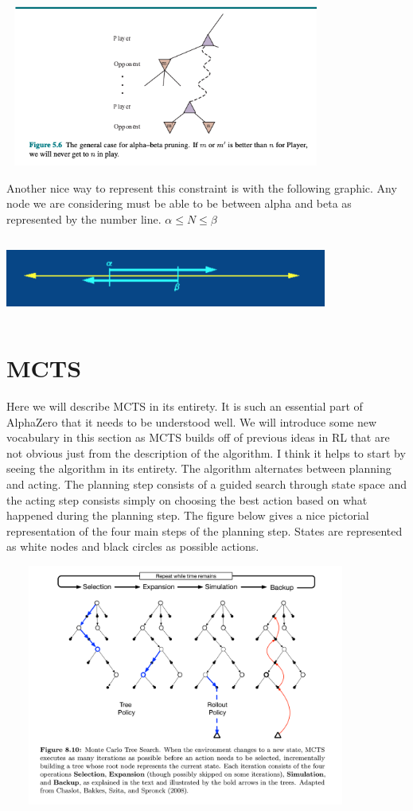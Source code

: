 \begin{search_page}
\includegraphics[width=400px,height=200px]{images/AI_figure_5_6.png}

Another nice way to represent this constraint is with the following graphic. Any node we are considering must be able to be between alpha and beta as represented by the number line. $ \alpha \leq N \leq \beta $

\includegraphics[width=400px,height=100px]{images/alpha_beta_number_line.png}

\section{MCTS}

Here we will describe MCTS in its entirety. It is such an essential part of AlphaZero that it needs to be understood well. We will introduce some new vocabulary in this section as MCTS builds off of previous ideas in RL that are not obvious just from the description of the algorithm. I think it helps to start by seeing the algorithm in its entirety. The algorithm alternates between planning and acting. The planning step consists of a guided search through state space and the acting step consists simply on choosing the best action based on what happened during the planning step. The figure below gives a nice pictorial representation of the four main steps of the planning step. States are represented as white nodes and black circles as possible actions.    

\includegraphics[width=450px,height=300px]{images/mcts}


\end{search_page}
